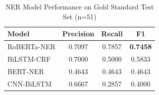 
\begin{table}[htbp]
\centering
\caption{NER Model Performance on Gold Standard Test Set (n=51)}
\label{tab:gold-evaluation}
\begin{tabular}{lccc}
\toprule
\textbf{Model} & \textbf{Precision} & \textbf{Recall} & \textbf{F1} \\
\midrule
RoBERTa-NER & 0.7097 & 0.7857 & \textbf{0.7458} \\
BiLSTM-CRF & 0.7000 & 0.5000 & 0.5833 \\
BERT-NER & 0.4643 & 0.4643 & 0.4643 \\
CNN-BiLSTM & 0.6667 & 0.2857 & 0.4000 \\
\bottomrule
\end{tabular}
\end{table}
